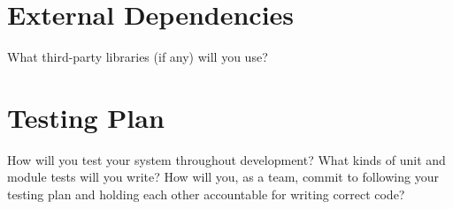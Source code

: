 \documentclass[10pt]{article}
\begin{document}
\part*{External Dependencies}
What third-party libraries (if any) will you use?
\part*{Testing Plan}
How will you test your system throughout development? What kinds of unit and module tests will you write? How will you, as a team, commit to following your testing plan and holding each other accountable for writing correct code?
\end{document}
